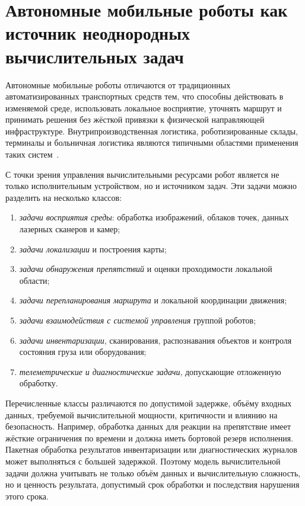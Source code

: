 \section{Автономные мобильные роботы как источник неоднородных вычислительных задач}

Автономные мобильные роботы отличаются от традиционных автоматизированных транспортных средств тем, что способны действовать в изменяемой среде, использовать локальное восприятие, уточнять маршрут и принимать решения без жёсткой привязки к физической направляющей инфраструктуре. Внутрипроизводственная логистика, роботизированные склады, терминалы и больничная логистика являются типичными областями применения таких систем~\cite{Lackner2024AMRIntralogistics,Fragapane2024AMRMaterialHandling,Fragapane2021AMRPlanning}.

С точки зрения управления вычислительными ресурсами робот является не только исполнительным устройством, но и источником задач. Эти задачи можно разделить на несколько классов:
\begin{enumerate}
    \item \textit{задачи восприятия среды}: обработка изображений, облаков точек, данных лазерных сканеров и камер;
    \item \textit{задачи локализации} и построения карты;
    \item \textit{задачи обнаружения препятствий} и оценки проходимости локальной области;
    \item \textit{задачи перепланирования маршрута} и локальной координации движения;
    \item \textit{задачи взаимодействия с системой управления} группой роботов;
    \item \textit{задачи инвентаризации}, сканирования, распознавания объектов и контроля состояния груза или оборудования;
    \item \textit{телеметрические и диагностические задачи}, допускающие отложенную обработку.
\end{enumerate}

Перечисленные классы различаются по допустимой задержке, объёму входных данных, требуемой вычислительной мощности, критичности и влиянию на безопасность. Например, обработка данных для реакции на препятствие имеет жёсткие ограничения по времени и должна иметь бортовой резерв исполнения. Пакетная обработка результатов инвентаризации или диагностических журналов может выполняться с большей задержкой. Поэтому модель вычислительной задачи должна учитывать не только объём данных и вычислительную сложность, но и ценность результата, допустимый срок обработки и последствия нарушения этого срока.

